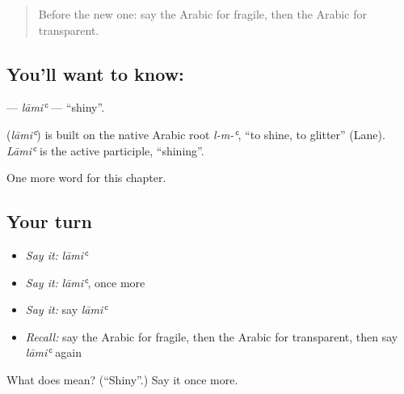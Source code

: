 \label{lesson:AR-C212-lami}



\begin{quote}
Before the new one: say the Arabic for fragile, then the Arabic for transparent.
\end{quote}

\subsection*{You'll want to know: }
\textbf{} — \emph{lāmiʿ} — \textquotedblleft{}shiny\textquotedblright{}.

\begin{cousinweb}
\textbf{} (\emph{lāmiʿ}) is built on the native Arabic root \emph{l-m-ʿ}, \textquotedblleft{}to shine, to glitter\textquotedblright{} (Lane). \emph{Lāmiʿ} is the active participle, \textquotedblleft{}shining\textquotedblright{}.
\end{cousinweb}

\begin{grammarlens}[title={What you've built}]
One more word for this chapter.
\end{grammarlens}

\subsection*{Your turn}
\begin{itemize}
\raggedright
  \item \emph{Say it:} \emph{lāmiʿ}
  \item \emph{Say it:} \emph{lāmiʿ}, once more
  \item \emph{Say it:} say \emph{lāmiʿ}
  \item \emph{Recall:} say the Arabic for fragile, then the Arabic for transparent, then say \emph{lāmiʿ} again
\end{itemize}

\begin{tcolorbox}[breakable,colback=teal!4,colframe=teal!35!black,title={Before you move on}]
What does  mean? (\textquotedblleft{}Shiny\textquotedblright{}.) Say it once more.
\end{tcolorbox}
